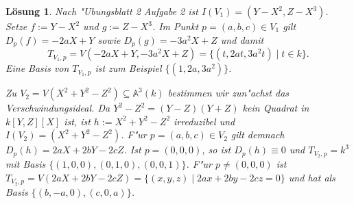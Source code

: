 \documentclass[a4paper, 12pt, numbers=noendperiod, chapterprefix=true, headsepline]{scrbook}
\theoremstyle{break}
\newtheorem{Loes}{L\"osung}
\theoremstyle{nonumberbreak}
\theoremstyle{nonumberplain}
\newcommand{\A}{\mathbb{A}}
\begin{document}
\begin{Loes}
Nach "Ubungsblatt 2 Aufgabe 2 ist $I(V_1) = (Y-X^2,Z-X^3)$. Setze $f := Y-X^2$ und $g := Z - X^3$. Im Punkt $p=(a,b,c) \in V_1$ gilt $D_p(f) = -2aX+Y$ sowie $D_p(g) = -3a^2X+Z$ und damit
 \[T_{V_1,p} = V(-2aX+Y,-3a^2X+Z) = \{(t,2at,3a^2t) \mid t \in k\}.\]
Eine Basis von $T_{V_1,p}$ ist zum Beispiel $\{(1, 2a,3a^2)\}$.

Zu $V_2 = V(X^2+Y^2-Z^2) \subseteq \A^3(k)$ bestimmen wir zun"achst das Verschwindungsideal. Da $Y^2-Z^2 = (Y-Z)(Y+Z)$ kein Quadrat in $k[Y,Z][X]$ ist, ist $h := X^2+Y^2-Z^2$ irreduzibel und $I(V_2) =(X^2+Y^2-Z^2)$. F"ur $p=(a,b,c) \in V_2$ gilt demnach $D_p(h) = 2aX+2bY-2cZ$. Ist $p=(0,0,0)$, so ist $D_p(h) \equiv 0$ und $T_{V_2,p} = k^3$ mit Basis $\{(1,0,0), (0,1,0),(0,0,1)\}$. F"ur $p \neq (0,0,0)$ ist $T_{V_2,p} = V(2aX+2bY-2cZ) = \{(x,y,z) \mid 2ax+2by-2cz = 0\}$ und hat als Basis $\{(b,-a,0),(c,0,a)\}$.
\end{Loes}
\end{document}
